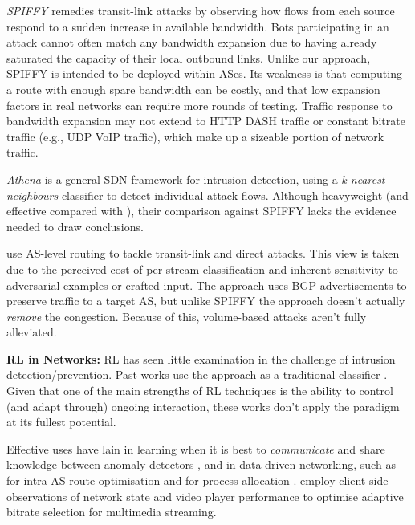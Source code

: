 \documentclass[10pt, times, conference, letterpaper]{IEEEtran}
\newcommand{\fakepara}[1]{\noindent\textbf{#1:}}
\begin{document}
\emph{SPIFFY} \cite{DBLP:conf/ndss/KangGS16} remedies transit-link attacks by observing how flows from each source respond to a sudden increase in available bandwidth.
Bots participating in an attack cannot often match any bandwidth expansion due to having already saturated the capacity of their local outbound links.
Unlike our approach, SPIFFY is intended to be deployed within ASes.
Its weakness is that computing a route with enough spare bandwidth can be costly, and that low expansion factors in real networks can require more rounds of testing. 
Traffic response to bandwidth expansion may not extend to HTTP DASH traffic or constant bitrate traffic (e.g., UDP VoIP traffic), which make up a sizeable portion of network traffic.

\emph{Athena} \cite{DBLP:conf/dsn/LeeKSPY17} is a general SDN framework for intrusion detection, using a \emph{k-nearest neighbours} classifier to detect individual attack flows.
Although heavyweight (and effective compared with \textcite{DBLP:conf/lcn/BragaMP10}), their comparison against SPIFFY lacks the evidence needed to draw conclusions.

\Textcite{DBLP:conf/sp/SmithS18} use AS-level routing to tackle transit-link and direct attacks.
This view is taken due to the perceived cost of per-stream classification and inherent sensitivity to adversarial examples or crafted input.
The approach uses BGP advertisements to preserve traffic to a target AS, but unlike SPIFFY the approach doesn't actually \emph{remove} the congestion.
Because of this, volume-based attacks aren't fully alleviated.

\fakepara{RL in Networks}
RL has seen little examination in the challenge of intrusion detection/prevention.
Past works use the approach as a traditional classifier \cite{shamshirband2014anomaly,DBLP:conf/mates/ServinK08}.
Given that one of the main strengths of RL techniques is the ability to control (and adapt through) ongoing interaction, these works don't apply the paradigm at its fullest potential.

Effective uses have lain in learning when it is best to \emph{communicate} and share knowledge between anomaly detectors \cite{DBLP:conf/paisi/XuSH07}, and in data-driven networking, such as for intra-AS route optimisation \cite{DBLP:conf/hotnets/ValadarskySST17} and for process allocation \cite{DBLP:conf/hotnets/MaoAMK16}.
\Textcite{DBLP:conf/sigcomm/MaoNA17} employ client-side observations of network state and video player performance to optimise adaptive bitrate selection for multimedia streaming.
\end{document}
